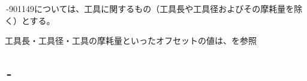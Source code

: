 \clearpage
\,-\ttNum901149については、工具に関するもの（工具長や工具径およびその摩耗量を除く）とする。
\begin{hosoku}
工具長・工具径・工具の摩耗量といったオフセットの値は、を参照
\end{hosoku}

\subsection{\,-}

